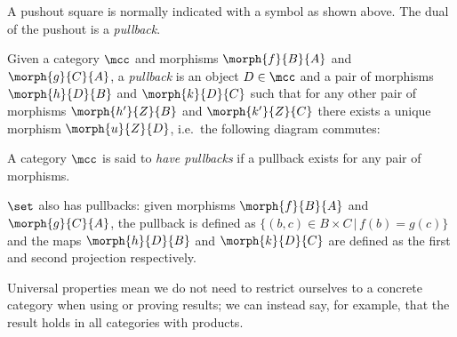 A pushout square is normally indicated with a \raisebox{-0.25em}{\(\ulcorner\)}
symbol as shown above.
The dual of the pushout is a \emph{pullback}.

\begin{definition}[Pullback]
    Given a category \(\mcc\) and morphisms \(\morph{f}{B}{A}\) and
    \(\morph{g}{C}{A}\), a \emph{pullback} is an object \(D \in \mcc\) and a
    pair of morphisms \(\morph{h}{D}{B}\) and \(\morph{k}{D}{C}\) such that for
    any other pair of morphisms \(\morph{h^\prime}{Z}{B}\) and
    \(\morph{k^\prime}{Z}{C}\) there exists a unique morphism
    \(\morph{u}{Z}{D}\), i.e.\ the following diagram commutes:
    \begin{center}
        
    \end{center}
    A category \(\mcc\) is said to \emph{have pullbacks} if a pullback exists
    for any pair of morphisms.
\end{definition}

\begin{example}
    \(\set\) also has pullbacks: given morphisms \(\morph{f}{B}{A}\) and
    \(\morph{g}{C}{A}\), the pullback is defined as
    \(\{(b,c) \in B \times C \,|\, f(b) = g(c)\}\) and the maps
    \(\morph{h}{D}{B}\) and \(\morph{k}{D}{C}\) are defined as the first and
    second projection respectively.
\end{example}

Universal properties mean we do not need to restrict ourselves to a
concrete category when using or proving results; we can instead say, for
example, that the result holds in all categories with products.